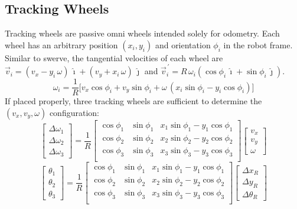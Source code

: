 \documentclass{article}
\newcommand{\pvec}[1]{\vec{#1}^{\,\prime}}
\begin{document}
\subsection{Tracking Wheels}
Tracking wheels are passive omni wheels intended solely for odometry. Each wheel has an arbitrary position $(x_i, y_i)$ and orientation $\phi_i$ in the robot frame. Similar to swerve, the tangential velocities of each wheel are $\vec{v}_i = (v_x - y_i \, \omega) \, \hat{\imath} + (v_y + x_i \, \omega) \, \hat{\jmath}$ and $\pvec{v}_i = R \, \omega_i (\operatorname{cos} \phi_i \, \hat{\imath} + \operatorname{sin} \phi_i \, \hat{\jmath})$. 
$$
    \omega_i = \frac{1}{R}\Big[v_x \operatorname{cos} \phi_i + v_y \operatorname{sin} \phi_i + \omega \, (x_i \operatorname{sin} \phi_i - y_i \operatorname{cos} \phi_i)\Big]
$$
If placed properly, three tracking wheels are sufficient to determine the $(v_x, v_y, \omega)$ configuration:
$$
\begin{bmatrix}
    \Delta \omega_1\\
    \Delta \omega_2\\
    \Delta \omega_3
\end{bmatrix}
=
\frac{1}{R}
\begin{bmatrix}
    \operatorname{cos} \phi_1 & \operatorname{sin} \phi_1 & x_1 \operatorname{sin} \phi_1 - y_1 \operatorname{cos} \phi_1 \\
    \operatorname{cos} \phi_2 & \operatorname{sin} \phi_2 & x_2 \operatorname{sin} \phi_2 - y_2 \operatorname{cos} \phi_2 \\
    \operatorname{cos} \phi_3 & \operatorname{sin} \phi_3 & x_3 \operatorname{sin} \phi_3 - y_3 \operatorname{cos} \phi_3 \\
\end{bmatrix}
\begin{bmatrix}
    v_x\\
    v_y\\
    \omega
\end{bmatrix}
$$
$$
\begin{bmatrix}
    \theta_1\\
    \theta_2\\
    \theta_3
\end{bmatrix}
=
\frac{1}{R}
\begin{bmatrix}
    \operatorname{cos} \phi_1 & \operatorname{sin} \phi_1 & x_1 \operatorname{sin} \phi_1 - y_1 \operatorname{cos} \phi_1 \\
    \operatorname{cos} \phi_2 & \operatorname{sin} \phi_2 & x_2 \operatorname{sin} \phi_2 - y_2 \operatorname{cos} \phi_2 \\
    \operatorname{cos} \phi_3 & \operatorname{sin} \phi_3 & x_3 \operatorname{sin} \phi_3 - y_3 \operatorname{cos} \phi_3 \\
\end{bmatrix}
\begin{bmatrix}
    \Delta x_R\\
    \Delta y_R\\
    \Delta \theta_R
\end{bmatrix}
$$
\end{document}

